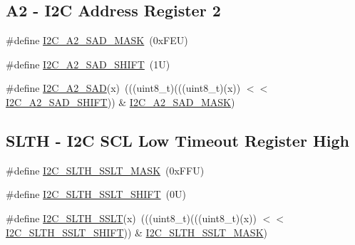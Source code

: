 \subsection*{A2 -\/ I2C Address Register 2}
\begin{DoxyCompactItemize}
\item 
\#define \mbox{\hyperlink{group___i2_c___register___masks_ga953881ff63411be620fa173f27ab4efa}{I2\+C\+\_\+\+A2\+\_\+\+S\+A\+D\+\_\+\+M\+A\+SK}}~(0x\+F\+E\+U)
\item 
\#define \mbox{\hyperlink{group___i2_c___register___masks_gad1c31a37087b37cb76faeade10a4fbd6}{I2\+C\+\_\+\+A2\+\_\+\+S\+A\+D\+\_\+\+S\+H\+I\+FT}}~(1\+U)
\item 
\#define \mbox{\hyperlink{group___i2_c___register___masks_gadb02a0d0b664b563e9f18a9a4d90fb8f}{I2\+C\+\_\+\+A2\+\_\+\+S\+AD}}(x)~(((uint8\+\_\+t)(((uint8\+\_\+t)(x)) $<$$<$ \mbox{\hyperlink{group___i2_c___register___masks_gad1c31a37087b37cb76faeade10a4fbd6}{I2\+C\+\_\+\+A2\+\_\+\+S\+A\+D\+\_\+\+S\+H\+I\+FT}})) \& \mbox{\hyperlink{group___i2_c___register___masks_ga953881ff63411be620fa173f27ab4efa}{I2\+C\+\_\+\+A2\+\_\+\+S\+A\+D\+\_\+\+M\+A\+SK}})
\end{DoxyCompactItemize}
\subsection*{S\+L\+TH -\/ I2C S\+CL Low Timeout Register High}
\begin{DoxyCompactItemize}
\item 
\#define \mbox{\hyperlink{group___i2_c___register___masks_gaeef081c4825bc9248b218f4c6ee70f86}{I2\+C\+\_\+\+S\+L\+T\+H\+\_\+\+S\+S\+L\+T\+\_\+\+M\+A\+SK}}~(0x\+F\+F\+U)
\item 
\#define \mbox{\hyperlink{group___i2_c___register___masks_gadc7429d429b6c58a18bcf147884e618f}{I2\+C\+\_\+\+S\+L\+T\+H\+\_\+\+S\+S\+L\+T\+\_\+\+S\+H\+I\+FT}}~(0\+U)
\item 
\#define \mbox{\hyperlink{group___i2_c___register___masks_gaf6d95ca3bdf2d8da490e7ff3c4a937b7}{I2\+C\+\_\+\+S\+L\+T\+H\+\_\+\+S\+S\+LT}}(x)~(((uint8\+\_\+t)(((uint8\+\_\+t)(x)) $<$$<$ \mbox{\hyperlink{group___i2_c___register___masks_gadc7429d429b6c58a18bcf147884e618f}{I2\+C\+\_\+\+S\+L\+T\+H\+\_\+\+S\+S\+L\+T\+\_\+\+S\+H\+I\+FT}})) \& \mbox{\hyperlink{group___i2_c___register___masks_gaeef081c4825bc9248b218f4c6ee70f86}{I2\+C\+\_\+\+S\+L\+T\+H\+\_\+\+S\+S\+L\+T\+\_\+\+M\+A\+SK}})
\end{DoxyCompactItemize}

